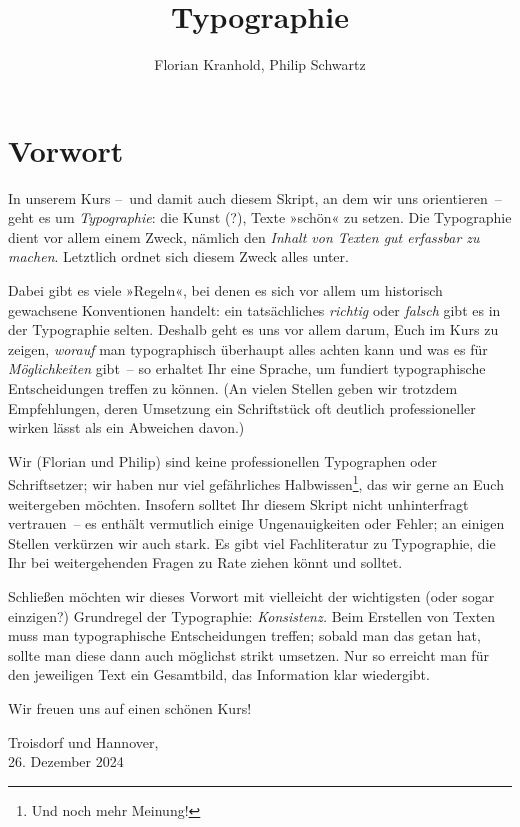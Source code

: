 \documentclass[british,ngerman]{scrbook}
\author{Florian Kranhold, Philip Schwartz}
\title {Typographie}
\begin{document}
\frontmatter


\chapter*{Vorwort}
In unserem Kurs --~und damit auch diesem Skript, an dem wir uns
orientieren~-- geht es um \emph{Typographie}: die Kunst (?), Texte
»schön« zu setzen.  Die Typographie dient vor allem einem Zweck,
nämlich den \emph{Inhalt von Texten gut erfassbar zu machen}.
Letztlich ordnet sich diesem Zweck alles unter.

Dabei gibt es viele »Regeln«, bei denen es sich vor allem um
historisch gewachsene Konventionen handelt: ein tatsächliches
\emph{richtig} oder \emph{falsch} gibt es in der Typographie selten.
Deshalb geht es uns vor allem darum, Euch im Kurs zu zeigen,
\emph{worauf} man typographisch überhaupt alles achten kann und was es
für \emph{Möglichkeiten} gibt~-- so erhaltet Ihr eine Sprache, um
fundiert typographische Entscheidungen treffen zu können.  (An vielen
Stellen geben wir trotzdem Empfehlungen, deren Umsetzung ein
Schriftstück oft deutlich professioneller wirken lässt als ein
Abweichen davon.)

Wir (Florian und Philip) sind keine professionellen Typographen oder
Schriftsetzer; wir haben nur viel gefährliches Halbwissen\footnote{Und
  noch mehr Meinung!}, das wir gerne an Euch weitergeben möchten.
Insofern solltet Ihr diesem Skript nicht unhinterfragt vertrauen~-- es
enthält vermutlich einige Ungenauigkeiten oder Fehler; an einigen
Stellen verkürzen wir auch stark.  Es gibt viel Fachliteratur zu
Typographie, die Ihr bei weitergehenden Fragen zu Rate ziehen könnt
und solltet.

Schließen möchten wir dieses Vorwort mit vielleicht der wichtigsten
(oder sogar einzigen?) Grundregel der Typographie: \emph{Konsistenz.}
Beim Erstellen von Texten muss man typographische Entscheidungen
treffen; sobald man das getan hat, sollte man diese dann auch
möglichst strikt umsetzen.  Nur so erreicht man für den jeweiligen
Text ein Gesamtbild, das Information klar wiedergibt.

Wir freuen uns auf einen schönen Kurs!

\begin{flushright}
  Troisdorf und Hannover,\\26. Dezember 2024
\end{flushright}

\mainmatter




\end{document}

